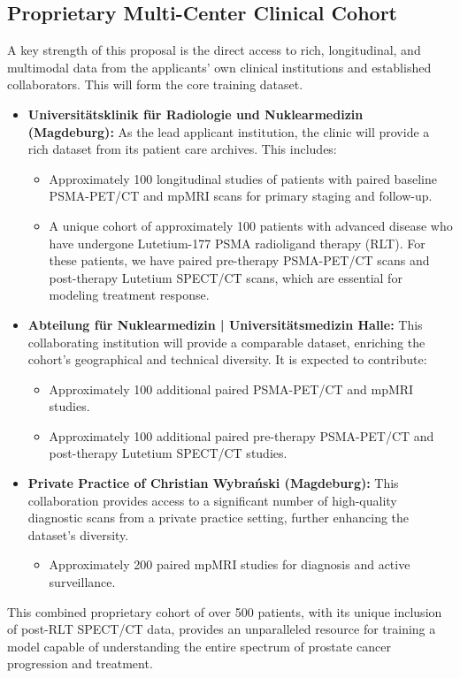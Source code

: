 \documentclass[11pt, a4paper]{article}
\begin{document}
\subsection{Proprietary Multi-Center Clinical Cohort}
A key strength of this proposal is the direct access to rich, longitudinal, and multimodal data from the applicants' own clinical institutions and established collaborators. This will form the core training dataset.

\begin{itemize}
    \item \textbf{Universitätsklinik für Radiologie und Nuklearmedizin (Magdeburg):} As the lead applicant institution, the clinic will provide a rich dataset from its patient care archives. This includes:
    \begin{itemize}
        \item Approximately 100 longitudinal studies of patients with paired baseline PSMA-PET/CT and mpMRI scans for primary staging and follow-up.
        \item A unique cohort of approximately 100 patients with advanced disease who have undergone Lutetium-177 PSMA radioligand therapy (RLT). For these patients, we have paired pre-therapy PSMA-PET/CT scans and post-therapy Lutetium SPECT/CT scans, which are essential for modeling treatment response.
    \end{itemize}
    \item \textbf{Abteilung für Nuklearmedizin | Universitätsmedizin Halle:} This collaborating institution will provide a comparable dataset, enriching the cohort's geographical and technical diversity. It is expected to contribute:
    \begin{itemize}
        \item Approximately 100 additional paired PSMA-PET/CT and mpMRI studies.
        \item Approximately 100 additional paired pre-therapy PSMA-PET/CT and post-therapy Lutetium SPECT/CT studies.
    \end{itemize}
    \item \textbf{Private Practice of Christian Wybrański (Magdeburg):} This collaboration provides access to a significant number of high-quality diagnostic scans from a private practice setting, further enhancing the dataset's diversity.
    \begin{itemize}
        \item Approximately 200 paired mpMRI studies for diagnosis and active surveillance.
    \end{itemize}
\end{itemize}
This combined proprietary cohort of over 500 patients, with its unique inclusion of post-RLT SPECT/CT data, provides an unparalleled resource for training a model capable of understanding the entire spectrum of prostate cancer progression and treatment.
\end{document}
